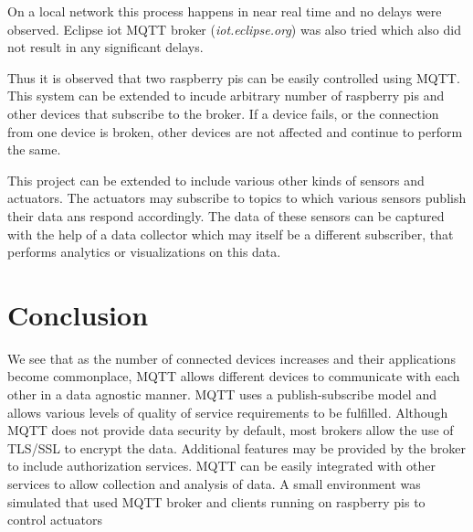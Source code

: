 \documentclass[sigconf]{acmart}
\begin{document}
On a local network this process happens in near real time and no
delays were observed. Eclipse iot MQTT broker ({\em iot.eclipse.org})
was also tried which also did not result in any significant delays.

Thus it is observed that two raspberry pis can be easily controlled
using MQTT. This system can be extended to incude arbitrary number of
raspberry pis and other devices that subscribe to the broker. If a
device fails, or the connection from one device is broken, other
devices are not affected and continue to perform the same.

This project can be extended to include various other kinds of sensors
and actuators. The actuators may subscribe to topics to which various
sensors publish their data ans respond accordingly. The data of these
sensors can be captured with the help of a data collector which may
itself be a different subscriber, that performs analytics or
visualizations on this data.

\section{Conclusion}

We see that as the number of connected devices increases and their
applications become commonplace, MQTT allows different devices to
communicate with each other in a data agnostic manner. MQTT uses a
publish-subscribe model and allows various levels of quality of
service requirements to be fulfilled. Although MQTT does not provide
data security by default, most brokers allow the use of TLS/SSL to
encrypt the data. Additional features may be provided by the broker to
include authorization services. MQTT can be easily integrated with
other services to allow collection and analysis of data. A small
environment was simulated that used MQTT broker and clients running on
raspberry pis to control actuators


 

%
\end{document}
